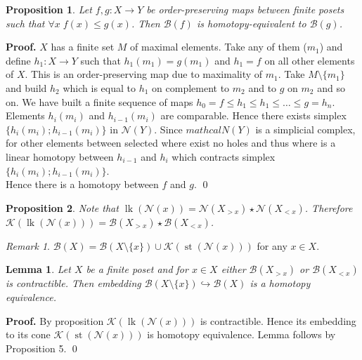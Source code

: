 \documentclass[a4paper, 12pt]{article}
\newtheorem{proposition}{Proposition}
\newtheorem{lemma}{Lemma}
\theoremstyle{definition}
\theoremstyle{remark}
\newtheorem{remark}{Remark}
\newenvironment{pf}{\noindent\textbf{Proof.}}{\qed}
\renewcommand{\leq}{\leqslant}
\begin{document}
\begin{proposition} {\cite[Proposition 2.2]{Bar11}}
  Let $f,g : X \to Y$ be order-preserving maps between finite posets such that $\forall x\;f(x) \leq g(x)$. Then $\mathcal{B}(f)$ is homotopy-equivalent to $\mathcal{B}(g)$.
\end{proposition}

\begin{pf}
  $X$ has a finite set $M$ of maximal elements. Take any of them ($m_1$) and define $h_1 : X \to Y$ such that $h_1(m_1) = g(m_1)$ and $h_1 = f$ on all other elements of $X$. This is an order-preserving map due to maximality of $m_1$. Take $M \setminus \{m_1\}$ and build $h_2$ which is equal to $h_1$ on complement to $m_2$ and to $g$ on $m_2$ and so on. We have built a finite sequence of maps $h_0 = f \leq h_1 \leq h_1 \leq \ldots \leq g = h_n$.\\

  Elements $h_i(m_i)$ and $h_{i-1}(m_i)$ are comparable. Hence there exists simplex $\{h_i(m_i); h_{i-1}(m_i)\}$ in $\mathcal{N}(Y)$. Since $mathcal{N}(Y)$ is a simplicial complex, for other elements between selected where exist no holes and thus where is a linear homotopy between $h_{i-1}$ and $h_{i}$ which contracts simplex $\{h_i(m_i); h_{i-1}(m_i)\}$.\\

  Hence there is a homotopy between $f$ and $g$.
\end{pf}

\begin{proposition}
  Note that $\operatorname{lk}(\mathcal{N}(x)) = \mathcal{N}(X_{>x}) \star \mathcal{N}(X_{<x})$. Therefore $\mathcal{K}(\operatorname{lk}(\mathcal{N}(x))) = \mathcal{B}(X_{>x}) \star \mathcal{B}(X_{<x})$.
\end{proposition}

\begin{remark}
  $\mathcal{B}(X) = \mathcal{B}(X \setminus \{x\}) \cup \mathcal{K}(\operatorname{st}(\mathcal{N}(x)))$ for any $x \in X$.\\
\end{remark}

\begin{lemma}
  Let $X$ be a finite poset and for $x \in X$ either $\mathcal{B}(X_{>x})$ or $\mathcal{B}(X_{<x})$ is contractible. Then embedding $\mathcal{B}(X \setminus \{x\}) \hookrightarrow \mathcal{B}(X)$ is a homotopy equivalence.
\end{lemma}

\begin{pf}
  By proposition $\mathcal{K}(\operatorname{lk}(\mathcal{N}(x)))$ is contractible. Hence its embedding to its cone $\mathcal{K}(\operatorname{st}(\mathcal{N}(x)))$ is homotopy equivalence. Lemma follows by Proposition 5.
\end{pf}
\end{document}
